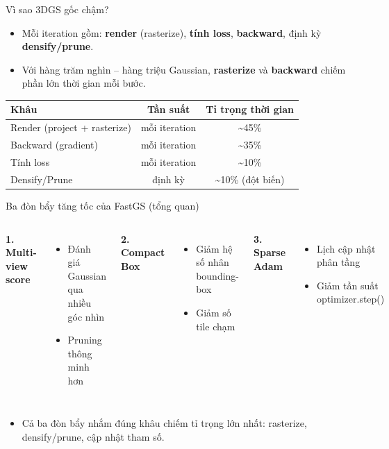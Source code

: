 \begin{frame}{Vì sao 3DGS gốc chậm?}
\begin{itemize}
    \item Mỗi iteration gồm: \textbf{render} (rasterize), \textbf{tính loss}, \textbf{backward}, định kỳ \textbf{densify/prune}.
    \item Với hàng trăm nghìn -- hàng triệu Gaussian, \textbf{rasterize} và \textbf{backward} chiếm phần lớn thời gian mỗi bước.
\end{itemize}
\vspace{0.3cm}
\centering
\footnotesize
\begin{tabular}{lcc}
\toprule
\textbf{Khâu} & \textbf{Tần suất} & \textbf{Tỉ trọng thời gian} \\
\midrule
Render (project + rasterize) & mỗi iteration & \textasciitilde 45\% \\
Backward (gradient) & mỗi iteration & \textasciitilde 35\% \\
Tính loss & mỗi iteration & \textasciitilde 10\% \\
Densify/Prune & định kỳ & \textasciitilde 10\% (đột biến) \\
\bottomrule
\end{tabular}
\end{frame}

\begin{frame}{Ba đòn bẩy tăng tốc của FastGS (tổng quan)}
\begin{columns}[t]
\centering
\textbf{1. Multi-view score}
\begin{itemize}
    \footnotesize
    \item Đánh giá Gaussian qua nhiều góc nhìn
    \item Pruning thông minh hơn
\end{itemize}
\centering
\textbf{2. Compact Box}
\begin{itemize}
    \footnotesize
    \item Giảm hệ số nhân bounding-box
    \item Giảm số tile chạm
\end{itemize}
\centering
\textbf{3. Sparse Adam}
\begin{itemize}
    \footnotesize
    \item Lịch cập nhật phân tầng
    \item Giảm tần suất optimizer.step()
\end{itemize}
\end{columns}
\vspace{0.4cm}
\begin{itemize}
    \item Cả ba đòn bẩy nhắm đúng khâu chiếm tỉ trọng lớn nhất: rasterize, densify/prune, cập nhật tham số.
\end{itemize}
\end{frame}

